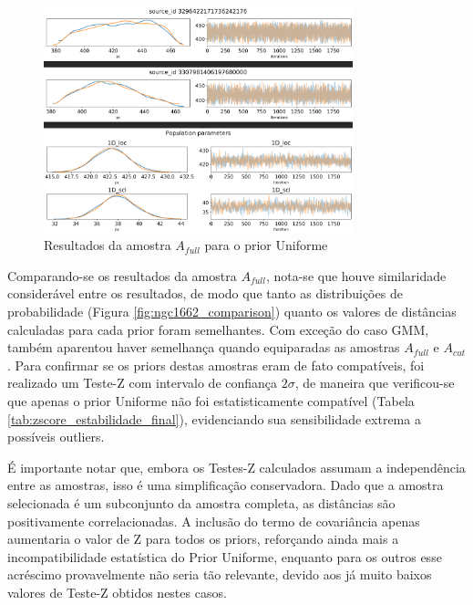 \documentclass[12pt]{projeto}
\begin{document}
\begin{figure}[ht]
\centering
\includegraphics[width= 0.8\textwidth]{uniforme_ngc1662.png}
\caption{\label{fig:uniforme_ngc1662} Resultados da amostra \(A_{full}\) para o prior Uniforme}
\end{figure}

Comparando-se os resultados da amostra \(A_{full}\), nota-se que houve similaridade considerável entre os resultados, de modo que tanto as distribuições de probabilidade (Figura \ref{fig:ngc1662_comparison}) quanto os valores de distâncias calculadas para cada prior foram semelhantes. Com exceção do caso GMM, também aparentou haver semelhança quando equiparadas as amostras \(A_{full}\) e \(A_{cut}\). Para confirmar se os priors destas amostras eram de fato compatíveis, foi realizado um Teste-Z com intervalo de confiança \(2\sigma\), de maneira que verificou-se que apenas o prior Uniforme não foi estatisticamente compatível (Tabela \ref{tab:zscore_estabilidade_final}), evidenciando sua sensibilidade extrema a possíveis outliers.

É importante notar que, embora os Testes-Z calculados assumam a independência entre as amostras, isso é uma simplificação conservadora. Dado que a amostra selecionada é um subconjunto da amostra completa, as distâncias são positivamente correlacionadas. A inclusão do termo de covariância apenas aumentaria o valor de Z para todos os priors, reforçando ainda mais a incompatibilidade estatística do Prior Uniforme, enquanto para os outros esse acréscimo provavelmente não seria tão relevante, devido aos já muito baixos valores de Teste-Z obtidos nestes casos.
\end{document}
